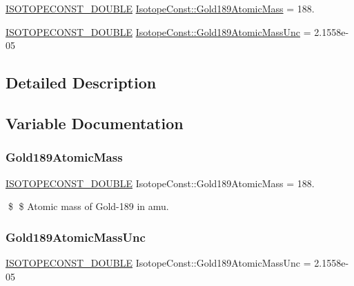 \begin{DoxyCompactItemize}
\item 
\mbox{\hyperlink{group___isotope_const-_macros_ga8f45a7272ce02c0b4c65c44636ed719a}{I\+S\+O\+T\+O\+P\+E\+C\+O\+N\+S\+T\+\_\+\+D\+O\+U\+B\+LE}} \mbox{\hyperlink{group___isotope_const-_gold-_au189_gaf0b275784d76881c7cf11394fe4751b7}{Isotope\+Const\+::\+Gold189\+Atomic\+Mass}} = 188.
\item 
\mbox{\hyperlink{group___isotope_const-_macros_ga8f45a7272ce02c0b4c65c44636ed719a}{I\+S\+O\+T\+O\+P\+E\+C\+O\+N\+S\+T\+\_\+\+D\+O\+U\+B\+LE}} \mbox{\hyperlink{group___isotope_const-_gold-_au189_ga2ddd1f85395711faa294803342fcb422}{Isotope\+Const\+::\+Gold189\+Atomic\+Mass\+Unc}} = 2.\+1558e-\/05
\end{DoxyCompactItemize}


\subsection{Detailed Description}


\subsection{Variable Documentation}
\mbox{\label{group___isotope_const-_gold-_au189_gaf0b275784d76881c7cf11394fe4751b7}} 
\subsubsection{\texorpdfstring{Gold189\+Atomic\+Mass}{Gold189AtomicMass}}
{\footnotesize\ttfamily \mbox{\hyperlink{group___isotope_const-_macros_ga8f45a7272ce02c0b4c65c44636ed719a}{I\+S\+O\+T\+O\+P\+E\+C\+O\+N\+S\+T\+\_\+\+D\+O\+U\+B\+LE}} Isotope\+Const\+::\+Gold189\+Atomic\+Mass = 188.}

\$ \$ Atomic mass of Gold-\/189 in amu. \mbox{\label{group___isotope_const-_gold-_au189_ga2ddd1f85395711faa294803342fcb422}} 
\subsubsection{\texorpdfstring{Gold189\+Atomic\+Mass\+Unc}{Gold189AtomicMassUnc}}
{\footnotesize\ttfamily \mbox{\hyperlink{group___isotope_const-_macros_ga8f45a7272ce02c0b4c65c44636ed719a}{I\+S\+O\+T\+O\+P\+E\+C\+O\+N\+S\+T\+\_\+\+D\+O\+U\+B\+LE}} Isotope\+Const\+::\+Gold189\+Atomic\+Mass\+Unc = 2.\+1558e-\/05}

